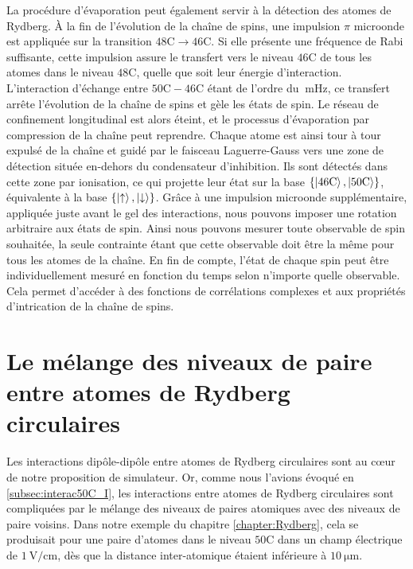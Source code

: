 La procédure d'évaporation peut également servir à la détection des atomes de Rydberg.
\`A la fin de l'évolution de la chaîne de spins, une impulsion $\pi$ microonde est appliquée sur la transition $\mathrm{48C}\rightarrow\mathrm{46C}$.
Si elle présente une fréquence de Rabi suffisante, cette impulsion assure le transfert vers le niveau $\mathrm{46C}$ de tous les atomes dans le niveau $\mathrm{48C}$, quelle que soit leur énergie d'interaction.
L'interaction d'échange entre $\mathrm{50C}-\mathrm{46C}$ étant de l'ordre du $\SI{}{\milli\hertz}$, ce transfert arrête l'évolution de la chaîne de spins et \og gèle \fg{} les états de spin.
Le réseau de confinement longitudinal est alors éteint, et le processus d'évaporation par compression de la chaîne peut reprendre.
Chaque atome est ainsi tour à tour expulsé de la chaîne et guidé par le faisceau Laguerre-Gauss vers une zone de détection située en-dehors du condensateur d'inhibition.
Ils sont détectés dans cette zone par ionisation, ce qui projette leur état sur la base $\{\ket{\mathrm{46C}},\ket{\mathrm{50C}}\}$, équivalente à la base $\{\ket{\uparrow},\ket{\downarrow} \}$.
Grâce à une impulsion microonde supplémentaire, appliquée juste avant le gel des interactions, nous pouvons imposer une rotation arbitraire aux états de spin. Ainsi nous pouvons mesurer toute observable de spin souhaitée, la seule contrainte étant que cette observable doit être la même pour tous les atomes de la chaîne.
En fin de compte, l'état de chaque spin peut être individuellement mesuré en fonction du temps selon n'importe quelle observable.
Cela permet d'accéder à des fonctions de corrélations complexes et aux propriétés d'intrication de la chaîne de spins.

\section{Le mélange des niveaux de paire entre atomes de Rydberg circulaires}
\noindent Les interactions dipôle-dipôle entre atomes de Rydberg circulaires sont au c\oe ur de notre proposition de simulateur.
Or, comme nous l'avions évoqué en \ref{subsec:interac50C_I}, les interactions entre atomes de Rydberg circulaires sont compliquées par le mélange des niveaux de paires atomiques avec des niveaux de paire voisins.
Dans notre exemple du chapitre \ref{chapter:Rydberg}, cela se produisait pour une paire d'atomes dans le niveau $\mathrm{50C}$ dans un champ électrique de $\SI{1}{\V/\cm}$, dès que la distance inter-atomique étaient inférieure à $\SI{10}{\um}$.

